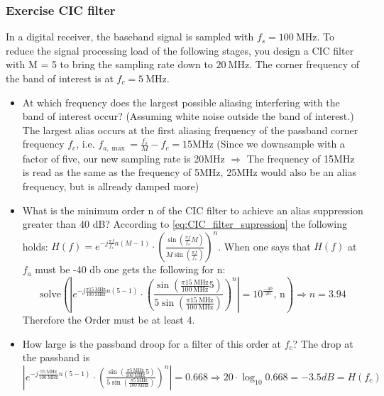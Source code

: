 \subsubsection{Exercise CIC filter}
In a digital receiver, the baseband signal is sampled with  $f_s = \SI{100}{\mega\hertz}$. To reduce the signal processing load
of the following stages, you design a CIC filter with M = 5 to bring the sampling rate down to $\SI{20}{\mega\hertz}$. The
corner frequency of the band of interest is at $f_c = \SI{5}{\mega\hertz}$.
\begin{itemize}
    \item At which frequency does the largest possible aliasing interfering with the band of interest occur? (Assuming white noise outside the band of interest.)\newline
    The largest alias occurs at the first aliasing frequency of the passband corner frequency $f_c$, i.e. $f_{a, \max }=\frac{f_s}{M}-f_c=15 \mathrm{MHz}$ (Since we downsample with a factor of five, our new sampling rate is 20MHz $\Rightarrow$ The frequency of 15MHz is read as the same as the frequency of 5MHz, 25MHz would also be an alias frequency, but is allready damped more)
    
    \item What is the minimum order n of the CIC filter to achieve an alias suppression greater than 40 dB?
    According to \autoref{eq:CIC_filter_supression} the following holds: $H(f)=e^{-j \frac{\pi f}{f_s} n(M-1)} \cdot\left(\frac{\sin \left(\frac{\pi f}{f_s} M\right)}{M \sin \left(\frac{\pi f}{f_s}\right)}\right)^n$. When one says that $H(f)$ at $f_a$ must be -40 db one gets the following for n: 
    $$\text{solve} \left(\left| e^{-j \frac{\pi \SI{15}{\mega\hertz}}{\SI{100}{\mega\hertz}} n(5-1)} \cdot\left(\frac{\sin \left(\frac{\pi \SI{15}{\mega\hertz}}{\SI{100}{\mega\hertz}} 5\right)}{5 \sin \left(\frac{\pi \SI{15}{\mega\hertz}}{\SI{100}{\mega\hertz}}\right)}\right)^n\right| = 10^{\frac{-40}{20}}\text{, n} \right)\Rightarrow n=3.94$$ Therefore the Order must be at least 4.
    \item How large is the passband droop for a filter of this order at $f_c$?\newline
    The drop at the passband is $\left| e^{-j \frac{\pi \SI{5}{\mega\hertz}}{\SI{100}{\mega\hertz}} n(5-1)} \cdot\left(\frac{\sin \left(\frac{\pi \SI{5}{\mega\hertz}}{\SI{100}{\mega\hertz}} 5\right)}{5 \sin \left(\frac{\pi \SI{5}{\mega\hertz}}{\SI{100}{\mega\hertz}}\right)}\right)^n\right|=0.668\Rightarrow 20\cdot \log_{10} 0.668=-3.5dB=H(f_c)$
\end{itemize}


